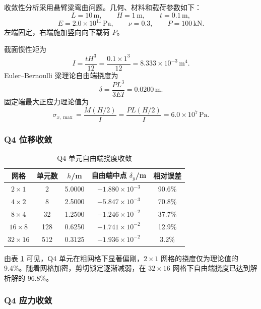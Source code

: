 \documentclass[UTF8,a4paper,zihao=-4]{ctexart}
\begin{document}
收敛性分析采用悬臂梁弯曲问题。几何、材料和载荷参数如下：
\[
    L=10\,\mathrm{m},\qquad
    H=1\,\mathrm{m},\qquad
    t=0.1\,\mathrm{m},
\]
\[
    E=2.0\times10^{11}\,\mathrm{Pa},\qquad
    \nu=0.3,\qquad
    P=100\,\mathrm{kN}.
\]
左端固定，右端施加竖向向下载荷 $P$。

截面惯性矩为
\begin{equation}
    I=\frac{tH^3}{12}
    =
    \frac{0.1\times1^3}{12}
    =
    8.333\times10^{-3}\,\mathrm{m^4}.
\end{equation}
Euler--Bernoulli 梁理论自由端挠度为
\begin{equation}
    \delta
    =
    \frac{PL^3}{3EI}
    =
    0.0200\,\mathrm{m}.
\end{equation}
固定端最大正应力理论值为
\begin{equation}
    \sigma_{x,\max}
    =
    \frac{M(H/2)}{I}
    =
    \frac{PL(H/2)}{I}
    =
    6.0\times10^7\,\mathrm{Pa}.
\end{equation}

\subsubsection{Q4 位移收敛}

\begin{table}[H]
    \centering
    \caption{Q4 单元自由端挠度收敛}
    \label{tab:q4_disp_conv}
    \begin{tabular}{ccccc}
        \toprule
        网格 & 单元数 & $h$/m & 自由端中点 $\delta_y$/m & 相对误差\\
        \midrule
        $2\times1$ & 2 & 5.0000 & $-1.880\times10^{-3}$ & 90.6\%\\
        $4\times2$ & 8 & 2.5000 & $-5.847\times10^{-3}$ & 70.8\%\\
        $8\times4$ & 32 & 1.2500 & $-1.246\times10^{-2}$ & 37.7\%\\
        $16\times8$ & 128 & 0.6250 & $-1.741\times10^{-2}$ & 12.9\%\\
        $32\times16$ & 512 & 0.3125 & $-1.936\times10^{-2}$ & 3.2\%\\
        \bottomrule
    \end{tabular}
\end{table}

由表 \ref{tab:q4_disp_conv} 可见，Q4 单元在粗网格下显著偏刚，$2\times1$ 网格的挠度仅为理论值的 9.4\%。随着网格加密，剪切锁定逐渐减弱，在 $32\times16$ 网格下自由端挠度已达到解析解的 96.8\%。

\subsubsection{Q4 应力收敛}
\end{document}
